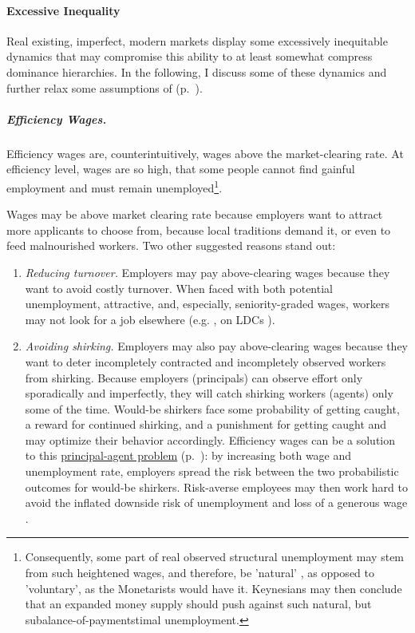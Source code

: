 \paragraph{Excessive Inequality} \label{sec:inequalitydynamics} Real existing, imperfect, modern markets display some excessively inequitable dynamics that may compromise this ability to at least somewhat compress dominance hierarchies. In the following, I discuss some of these dynamics and further relax some assumptions of   (p.~\pageref{sec:perfect-competition}). %

\subparagraph[Efficiency Wages]{Efficiency Wages.}  \label{sec:efficiencywages} Efficiency wages are, counterintuitively, wages above the market-clearing rate. At efficiency level, wages are so high, that some people cannot find gainful employment and must remain unemployed\footnote{
	Consequently, some part of real observed structural unemployment may stem from such heightened wages, and therefore, be 'natural' \citep{Schlicht1978}, as opposed to 'voluntary', as the Monetarists would have it. Keynesians may then conclude that an expanded money supply should push against such natural, but subalance-of-paymentstimal unemployment.}.

Wages may be above market clearing rate because employers want to attract more applicants to choose from, because local traditions demand it, or even to feed malnourished workers. Two other suggested reasons stand out: 

\begin{enumerate}
	\item \emph{Reducing turnover.} Employers may pay above-clearing wages because they want to avoid costly turnover. When faced with both potential unemployment, attractive, and, especially, seniority-graded wages, workers may not look for a job elsewhere (e.g. \citealt{Salop1979}, on \glspl{LDC} \citealt{Stiglitz1974a}).
	\item \emph{Avoiding shirking.} Employers may also pay above-clearing wages because they want to deter incompletely contracted and incompletely observed workers from shirking. Because employers (principals) can observe effort only sporadically and imperfectly, they will catch shirking workers (agents) only some of the time. Would-be shirkers face some probability of getting caught, a reward for continued shirking, and a punishment for getting caught and may optimize their behavior accordingly. Efficiency wages can be a solution to this \hyperref[sec:principal-agent-problem]{principal-agent problem} (p.~\pageref{sec:principal-agent-problem}): by increasing both wage and unemployment rate, employers spread the risk between the two probabilistic outcomes for would-be shirkers. Risk-averse employees may then work hard to avoid the inflated downside risk of unemployment and loss of a generous wage \citep{Stiglitz1984}.
\end{enumerate}

